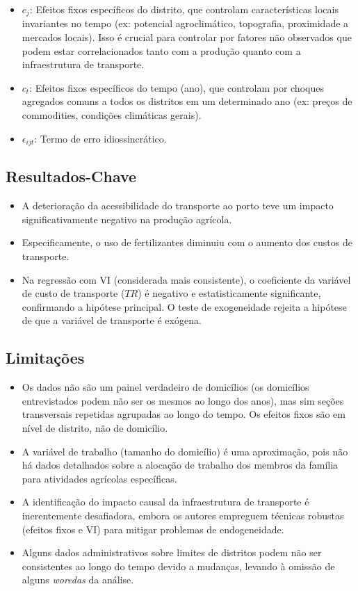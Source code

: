 \documentclass[12pt]{article}
\begin{document}
\begin{itemize}
    \item $c_j$: Efeitos fixos específicos do distrito, que controlam características locais invariantes no tempo (ex: potencial agroclimático, topografia, proximidade a mercados locais). Isso é crucial para controlar por fatores não observados que podem estar correlacionados tanto com a produção quanto com a infraestrutura de transporte.
    \item $c_t$: Efeitos fixos específicos do tempo (ano), que controlam por choques agregados comuns a todos os distritos em um determinado ano (ex: preços de commodities, condições climáticas gerais).
    \item $\epsilon_{ijt}$: Termo de erro idiossincrático.
\end{itemize}

\subsection*{Resultados-Chave}
\begin{itemize}
    \item A deterioração da acessibilidade do transporte ao porto teve um impacto significativamente negativo na produção agrícola.
    \item Especificamente, o uso de fertilizantes diminuiu com o aumento dos custos de transporte.
    \item Na regressão com VI (considerada mais consistente), o coeficiente da variável de custo de transporte ($TR$) é negativo e estatisticamente significante, confirmando a hipótese principal. O teste de exogeneidade rejeita a hipótese de que a variável de transporte é exógena.
\end{itemize}

\subsection*{Limitações}
\begin{itemize}
    \item Os dados não são um painel verdadeiro de domicílios (os domicílios entrevistados podem não ser os mesmos ao longo dos anos), mas sim seções transversais repetidas agrupadas ao longo do tempo. Os efeitos fixos são em nível de distrito, não de domicílio.
    \item A variável de trabalho (tamanho do domicílio) é uma aproximação, pois não há dados detalhados sobre a alocação de trabalho dos membros da família para atividades agrícolas específicas.
    \item A identificação do impacto causal da infraestrutura de transporte é inerentemente desafiadora, embora os autores empreguem técnicas robustas (efeitos fixos e VI) para mitigar problemas de endogeneidade.
    \item Alguns dados administrativos sobre limites de distritos podem não ser consistentes ao longo do tempo devido a mudanças, levando à omissão de alguns \textit{woredas} da análise.
\end{itemize}
\end{document}
